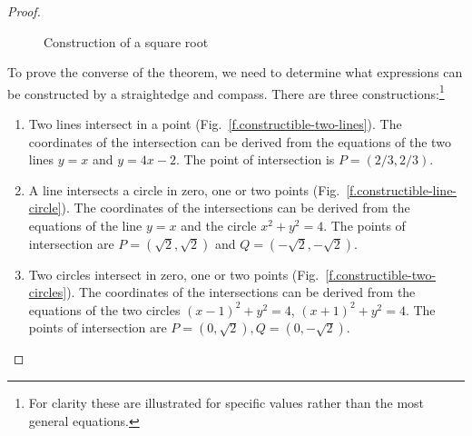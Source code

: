 \begin{proof}
\begin{figure}[b]
\begin{center}
\end{center}
\caption{Construction of a square root}
\label{f.trisect-square-root}
\end{figure}

\medskip

To prove the converse of the theorem, we need to determine what expressions can be constructed by a straightedge and compass. There are three constructions:\footnote{For clarity these are illustrated for specific values rather than the most general equations.}

\begin{enumerate}
\item Two lines intersect in a point (Fig.~\ref{f.constructible-two-lines}). The coordinates of the intersection can be derived from the equations of the two lines
$y=x$ and $y=4x-2$. The point of intersection is $P= (2/3, 2/3)$.

\item A line intersects a circle in zero, one or two points (Fig.~\ref{f.constructible-line-circle}). The coordinates of the intersections can be derived from the equations of the line $y=x$ and the circle $x^2+y^2=4$. The points of intersection are
$P=(\sqrt{2}, \sqrt{2})$ and $Q=(-\sqrt{2}, -\sqrt{2})$.

\item Two circles intersect in zero, one or two points (Fig.~\ref{f.constructible-two-circles}). The coordinates of the intersections can be derived from the equations of the two circles $(x-1)^2+y^2=4$, $(x+1)^2+y^2=4$. The points of intersection are $P=(0,\sqrt{2}),Q=(0,-\sqrt{2})$.
\end{enumerate}
\end{proof}


